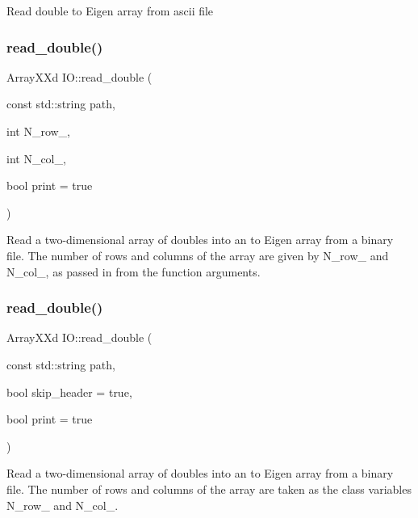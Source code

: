 Read double to Eigen array from ascii file\mbox{\label{class_i_o_aa2d53b758b98c564688d00ca5236744e}} 
\subsubsection{\texorpdfstring{read\+\_\+double()}{read\_double()}\hspace{0.1cm}{\footnotesize\ttfamily [1/2]}}
{\footnotesize\ttfamily Array\+X\+Xd I\+O\+::read\+\_\+double (\begin{DoxyParamCaption}\item[{const std\+::string}]{path,  }\item[{int}]{N\+\_\+row\+\_\+,  }\item[{int}]{N\+\_\+col\+\_\+,  }\item[{bool}]{print = {\ttfamily true} }\end{DoxyParamCaption})}

Read a two-\/dimensional array of doubles into an to Eigen array from a binary file. The number of rows and columns of the array are given by N\+\_\+row\+\_\+ and N\+\_\+col\+\_\+, as passed in from the function arguments.\mbox{\label{class_i_o_a34ed8843269915cb0b4eb8719da3535d}} 
\subsubsection{\texorpdfstring{read\+\_\+double()}{read\_double()}\hspace{0.1cm}{\footnotesize\ttfamily [2/2]}}
{\footnotesize\ttfamily Array\+X\+Xd I\+O\+::read\+\_\+double (\begin{DoxyParamCaption}\item[{const std\+::string}]{path,  }\item[{bool}]{skip\+\_\+header = {\ttfamily true},  }\item[{bool}]{print = {\ttfamily true} }\end{DoxyParamCaption})}

Read a two-\/dimensional array of doubles into an to Eigen array from a binary file. The number of rows and columns of the array are taken as the class variables N\+\_\+row\+\_\+ and N\+\_\+col\+\_\+.\mbox{\label{class_i_o_aed76c50d1122060292bfb10181edc990}} 
